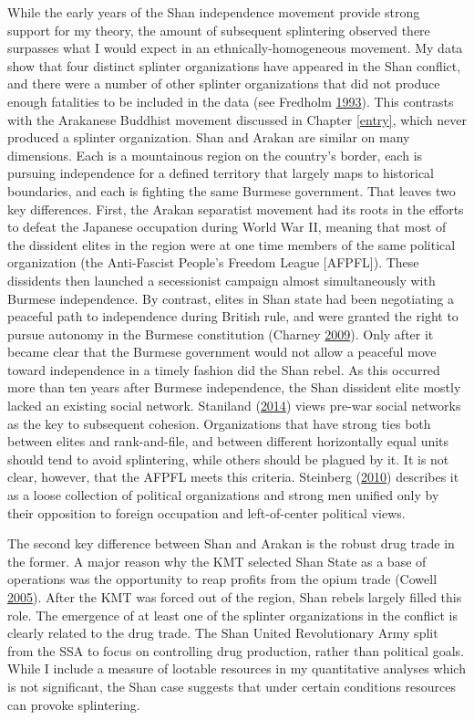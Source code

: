 \documentclass[12pt,]{book}
\theoremstyle{definition}
\theoremstyle{definition}
\theoremstyle{definition}
\theoremstyle{remark}
\begin{document}
While the early years of the Shan independence movement provide strong
support for my theory, the amount of subsequent splintering observed
there surpasses what I would expect in an ethnically-homogeneous
movement. My data show that four distinct splinter organizations have
appeared in the Shan conflict, and there were a number of other splinter
organizations that did not produce enough fatalities to be included in
the data (see Fredholm \protect\hyperlink{ref-Fredholm1993}{1993}). This
contrasts with the Arakanese Buddhist movement discussed in Chapter
\ref{entry}, which never produced a splinter organization. Shan and
Arakan are similar on many dimensions. Each is a mountainous region on
the country's border, each is pursuing independence for a defined
territory that largely maps to historical boundaries, and each is
fighting the same Burmese government. That leaves two key differences.
First, the Arakan separatist movement had its roots in the efforts to
defeat the Japanese occupation during World War II, meaning that most of
the dissident elites in the region were at one time members of the same
political organization (the Anti-Fascist People's Freedom League
{[}AFPFL{]}). These dissidents then launched a secessionist campaign
almost simultaneously with Burmese independence. By contrast, elites in
Shan state had been negotiating a peaceful path to independence during
British rule, and were granted the right to pursue autonomy in the
Burmese constitution (Charney
\protect\hyperlink{ref-Charney2009}{2009}). Only after it became clear
that the Burmese government would not allow a peaceful move toward
independence in a timely fashion did the Shan rebel. As this occurred
more than ten years after Burmese independence, the Shan dissident elite
mostly lacked an existing social network. Staniland
(\protect\hyperlink{ref-Staniland2014}{2014}) views pre-war social
networks as the key to subsequent cohesion. Organizations that have
strong ties both between elites and rank-and-file, and between different
horizontally equal units should tend to avoid splintering, while others
should be plagued by it. It is not clear, however, that the AFPFL meets
this criteria. Steinberg (\protect\hyperlink{ref-Steinberg2010}{2010})
describes it as a loose collection of political organizations and strong
men unified only by their opposition to foreign occupation and
left-of-center political views.

The second key difference between Shan and Arakan is the robust drug
trade in the former. A major reason why the KMT selected Shan State as a
base of operations was the opportunity to reap profits from the opium
trade (Cowell \protect\hyperlink{ref-Cowell2005}{2005}). After the KMT
was forced out of the region, Shan rebels largely filled this role. The
emergence of at least one of the splinter organizations in the conflict
is clearly related to the drug trade. The Shan United Revolutionary Army
split from the SSA to focus on controlling drug production, rather than
political goals. While I include a measure of lootable resources in my
quantitative analyses which is not significant, the Shan case suggests
that under certain conditions resources can provoke splintering.
\end{document}
